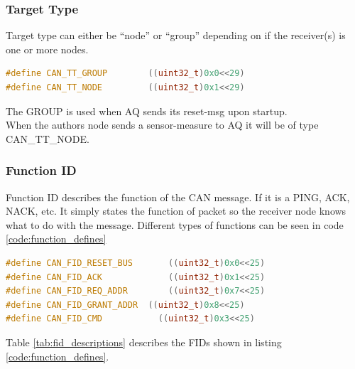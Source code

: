 \subsubsection*{Target Type}
Target type can either be “node” or “group” depending on if the receiver(s) is one or more nodes. 
\begin{lstlisting}[language = c, caption = Target type defined in AQ, label=code:target_types]
#define CAN_TT_GROUP        ((uint32_t)0x0<<29)
#define CAN_TT_NODE         ((uint32_t)0x1<<29)
\end{lstlisting}
The GROUP is used when AQ sends its reset-msg upon startup.\\
When the authors node sends a sensor-measure to AQ it will be of type CAN\_TT\_NODE.
\subsubsection*{Function ID}

Function ID describes the function of the CAN message. If it is a PING, ACK, NACK, etc.
It simply states the function of packet so the receiver node knows what to do with the message.
Different types of functions can be seen in code \ref{code:function_defines}
\begin{lstlisting}[language = c, caption = Excerpts from AQ's list of function defines, label=code:function_defines]
#define CAN_FID_RESET_BUS		((uint32_t)0x0<<25)
#define CAN_FID_ACK				((uint32_t)0x1<<25)
#define CAN_FID_REQ_ADDR		((uint32_t)0x7<<25)
#define CAN_FID_GRANT_ADDR	((uint32_t)0x8<<25)
#define CAN_FID_CMD           ((uint32_t)0x3<<25)
\end{lstlisting}

Table \ref{tab:fid_descriptions} describes the FIDs shown in listing \ref{code:function_defines}. \\

